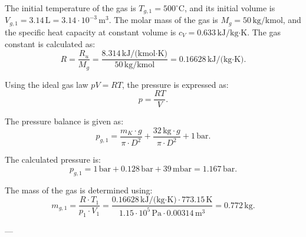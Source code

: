 The initial temperature of the gas is \( T_{g,1} = 500^\circ\text{C} \), and its initial volume is \( V_{g,1} = 3.14 \, \text{L} = 3.14 \cdot 10^{-3} \, \text{m}^3 \). The molar mass of the gas is \( M_g = 50 \, \text{kg/kmol} \), and the specific heat capacity at constant volume is \( c_V = 0.633 \, \text{kJ/kg·K} \). The gas constant is calculated as:  
\[
R = \frac{R_u}{M_g} = \frac{8.314 \, \text{kJ/(kmol·K)}}{50 \, \text{kg/kmol}} = 0.16628 \, \text{kJ/(kg·K)}.
\]

Using the ideal gas law \( pV = RT \), the pressure is expressed as:  
\[
p = \frac{RT}{V}.
\]

The pressure balance is given as:  
\[
p_{g,1} = \frac{m_K \cdot g}{\pi \cdot D^2} + \frac{32 \, \text{kg} \cdot g}{\pi \cdot D^2} + 1 \, \text{bar}.
\]

The calculated pressure is:  
\[
p_{g,1} = 1 \, \text{bar} + 0.128 \, \text{bar} + 39 \, \text{mbar} = 1.167 \, \text{bar}.
\]

The mass of the gas is determined using:  
\[
m_{g,1} = \frac{R \cdot T_1}{p_1 \cdot V_1} = \frac{0.16628 \, \text{kJ/(kg·K)} \cdot 773.15 \, \text{K}}{1.15 \cdot 10^5 \, \text{Pa} \cdot 0.00314 \, \text{m}^3} = 0.772 \, \text{kg}.
\]

---
